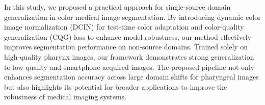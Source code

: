 In this study, we proposed a practical approach for single-source domain generalization in color medical image segmentation. 
By introducing dynamic color image normalization (DCIN) for test-time color adaptation and color-quality generalization (CQG) loss to enhance model robustness, our method effectively improves segmentation performance on non-source domains. 
Trained solely on high-quality pharynx images, our framework demonstrates strong generalization to low-quality and smartphone-acquired images. 
The proposed pipeline not only enhances segmentation accuracy across large domain shifts for pharyngeal images but also highlights its potential for broader applications to improve the robustness of medical imaging systems.

